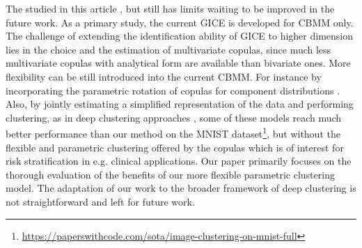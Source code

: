 The  studied in this article , but still has limits waiting to be improved in the future work. 
As a primary study, the current GICE is developed for  CBMM only.  The challenge of extending the identification ability of GICE to higher dimension lies in the choice and the estimation of multivariate copulas, since much less multivariate copulas with analytical form are available than bivariate ones. 
 More flexibility can be still introduced into the current CBMM. For instance by incorporating the parametric rotation of copulas for component distributions \cite{kosmidis2016model}. Also, 
by jointly estimating a simplified representation of the data and performing clustering, as in deep clustering approaches \cite{Ren_Arxiv:2022}, some of these models reach much better performance than our method on the MNIST dataset\footnote{\url{https://paperswithcode.com/sota/image-clustering-on-mnist-full}}, but without the flexible and parametric clustering offered by the copulas which is of interest for risk stratification in e.g. clinical applications. Our paper primarily focuses on the thorough evaluation of the benefits of our more flexible parametric clustering model. The adaptation of our work to the broader framework of deep clustering is not straightforward and left for future work.
